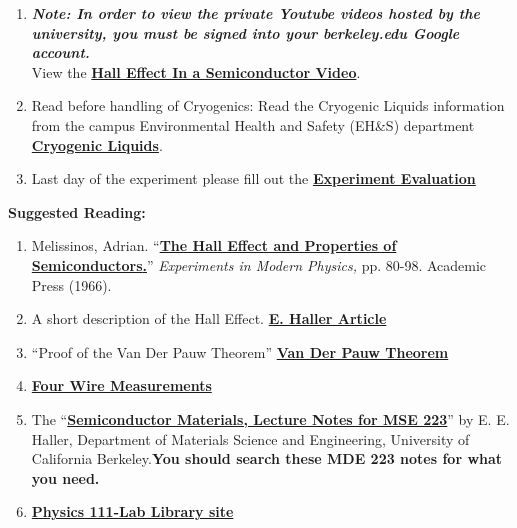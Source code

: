 \documentclass{../lab}
\begin{document}
\begin{enumerate}
    \item \emph{\textbf{Note: In order to view the private Youtube videos hosted by the university, you must be signed into your berkeley.edu Google account.}}\\
    View the \href{http://youtu.be/7JYq1rRl6Xk}{\textbf{Hall Effect In a Semiconductor Video}}.

    \item Read before handling of Cryogenics: Read the Cryogenic Liquids information from the campus Environmental Health and Safety (EH\&S) department \href{http://experimentationlab.berkeley.edu/sites/default/files/images/77cryogenic.pdf}{\textbf{Cryogenic Liquids}}.

    \item Last day of the experiment please fill out the \href{\ExperimentEvaluation}{\textbf{Experiment Evaluation}}

\end{enumerate}

\noindent\textbf{Suggested Reading:}

\begin{enumerate}
    \item Melissinos, Adrian. ``\href{http://physics111.lib.berkeley.edu/Physics111/Reprints/SHE/SHE\_Melissinos\_properties\_of\_semiconductors\_pg\_80-98\_1966.pdf}{\textbf{\textbf{The Hall Effect and Properties of Semiconductors}.}}'' \emph{Experiments in Modern Physics,} pp. 80-98. Academic Press (1966).

    \item A short description of the Hall Effect. \href{http://physics111.lib.berkeley.edu/Physics111/Reprints/SHE/24-Haller.pdf}{\textbf{E. Haller Article}}

    \item ``Proof of the Van Der Pauw Theorem'' \href{http://experimentationlab.berkeley.edu/node/105}{\textbf{\textbf{Van Der Pauw Theorem}}}

    \item \href{http://physics111.lib.berkeley.edu/Physics111/Reprints/SHE/19-Four\_Wire\_Measurement.pdf}{\textbf{Four Wire Measurements}}

    \item The ``\href{http://physics111.lib.berkeley.edu/Physics111/Reprints/SHE/Semiconductor\%20Materials\%20Notes\%20MSE\%20223\%20Haller.pdf}{\textbf{Semiconductor Materials, Lecture Notes for MSE 223}}'' by E. E. Haller, Department of Materials Science and Engineering, University of California Berkeley.\textbf{You should search these MDE 223 notes for what you need.}

    \item \href{\LabReprints}{\textbf{\textbf{Physics 111-Lab Library site}}}

\end{enumerate}
\end{document}
